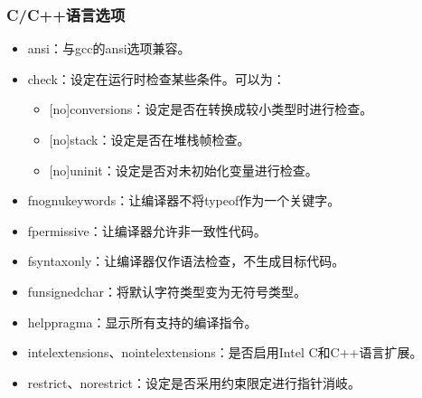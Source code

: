 \documentclass[a4paper,12pt,english]{sphinxmanual}
\begin{document}
\subsubsection{C/C++语言选项}
\label{\detokenize{compiler/intel:c-c}}\begin{itemize}
\item {} 
\sphinxAtStartPar
\sphinxhyphen{}ansi：与gcc的\sphinxhyphen{}ansi选项兼容。

\item {} 
\sphinxAtStartPar
\sphinxhyphen{}check：设定在运行时检查某些条件。可以为：
\begin{itemize}
\item {} 
\sphinxAtStartPar
{[}no{]}conversions：设定是否在转换成较小类型时进行检查。

\item {} 
\sphinxAtStartPar
{[}no{]}stack：设定是否在堆栈帧检查。

\item {} 
\sphinxAtStartPar
{[}no{]}uninit：设定是否对未初始化变量进行检查。

\end{itemize}

\item {} 
\sphinxAtStartPar
\sphinxhyphen{}fno\sphinxhyphen{}gnu\sphinxhyphen{}keywords：让编译器不将typeof作为一个关键字。

\item {} 
\sphinxAtStartPar
\sphinxhyphen{}fpermissive：让编译器允许非一致性代码。

\item {} 
\sphinxAtStartPar
\sphinxhyphen{}fsyntax\sphinxhyphen{}only：让编译器仅作语法检查，不生成目标代码。

\item {} 
\sphinxAtStartPar
\sphinxhyphen{}funsigned\sphinxhyphen{}char：将默认字符类型变为无符号类型。

\item {} 
\sphinxAtStartPar
\sphinxhyphen{}help\sphinxhyphen{}pragma：显示所有支持的编译指令。

\item {} 
\sphinxAtStartPar
\sphinxhyphen{}intel\sphinxhyphen{}extensions、\sphinxhyphen{}no\sphinxhyphen{}intel\sphinxhyphen{}extensions：是否启用Intel
C和C++语言扩展。

\item {} 
\sphinxAtStartPar
\sphinxhyphen{}restrict、\sphinxhyphen{}no\sphinxhyphen{}restrict：设定是否采用约束限定进行指针消岐。


\end{itemize}
\end{document}
